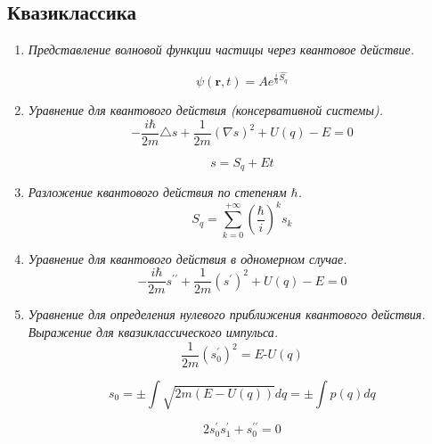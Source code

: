 \documentclass{article}
\begin{document}
{}
\subsection*{Квазиклассика}
	\begin{enumerate}
		\item \textit{Представление волновой функции частицы через квантовое действие.}

\begin{equation}
\psi(\boldsymbol{r},t)=Ae^{\frac{i}{\hbar}\hat{S_{q}}}
\end{equation}


		\item \textit{Уравнение для квантового действия (консервативной системы).}
\begin{equation}
-\frac{i\hbar}{2m}\triangle s+\frac{1}{2m}(\nabla s)^{2}+U(q)-E=0
\end{equation}


\begin{equation}
s=S_{q}+Et
\end{equation}


		\item \textit{Разложение квантового действия по степеням $\hbar$.}
\begin{equation}
S_{q}=\sum_{k=0}^{+\infty}(\frac{\hbar}{i})^{k}s_{k}
\end{equation}


		\item \textit{Уравнение для квантового действия в одномерном случае.} 
\begin{equation}
-\frac{i\hbar}{2m}s^{\prime\prime}+\frac{1}{2m}(s^{\prime})^{2}+U(q)-E=0
\end{equation}


		\item \textit{Уравнение для определения нулевого приближения квантового действия. Выражение для квазиклассического импульса.}  
\begin{equation}
\frac{1}{2m}(s_{0}^{\prime})^{2}=E\text{-}U(q)
\end{equation}


\begin{equation}
s_{0}=\pm\int\sqrt{2m(E-U(q))}dq=\pm\int p(q)dq
\end{equation}


\begin{equation}
2s{}_{0}^{\prime}s{}_{1}^{\prime}+s{}_{0}^{\prime\prime}=0
\end{equation}



\end{enumerate}
\end{document}
